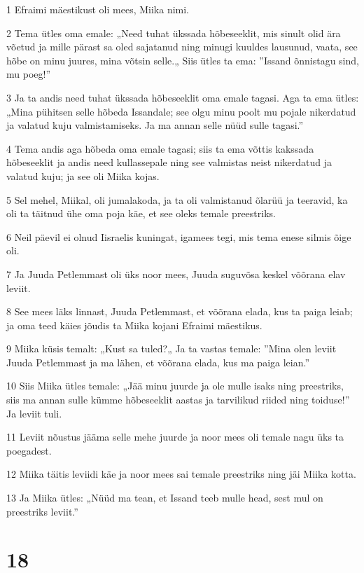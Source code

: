 \par 1 Efraimi mäestikust oli mees, Miika nimi.
\par 2 Tema ütles oma emale: „Need tuhat ükssada hõbeseeklit, mis sinult olid ära võetud ja mille pärast sa oled sajatanud ning minugi kuuldes lausunud, vaata, see hõbe on minu juures, mina võtsin selle.„ Siis ütles ta ema: ”Issand õnnistagu sind, mu poeg!”
\par 3 Ja ta andis need tuhat ükssada hõbeseeklit oma emale tagasi. Aga ta ema ütles: „Mina pühitsen selle hõbeda Issandale; see olgu minu poolt mu pojale nikerdatud ja valatud kuju valmistamiseks. Ja ma annan selle nüüd sulle tagasi.”
\par 4 Tema andis aga hõbeda oma emale tagasi; siis ta ema võttis kakssada hõbeseeklit ja andis need kullassepale ning see valmistas neist nikerdatud ja valatud kuju; ja see oli Miika kojas.
\par 5 Sel mehel, Miikal, oli jumalakoda, ja ta oli valmistanud õlarüü ja teeravid, ka oli ta täitnud ühe oma poja käe, et see oleks temale preestriks.
\par 6 Neil päevil ei olnud Iisraelis kuningat, igamees tegi, mis tema enese silmis õige oli.
\par 7 Ja Juuda Petlemmast oli üks noor mees, Juuda suguvõsa keskel võõrana elav leviit.
\par 8 See mees läks linnast, Juuda Petlemmast, et võõrana elada, kus ta paiga leiab; ja oma teed käies jõudis ta Miika kojani Efraimi mäestikus.
\par 9 Miika küsis temalt: „Kust sa tuled?„ Ja ta vastas temale: ”Mina olen leviit Juuda Petlemmast ja ma lähen, et võõrana elada, kus ma paiga leian.”
\par 10 Siis Miika ütles temale: „Jää minu juurde ja ole mulle isaks ning preestriks, siis ma annan sulle kümme hõbeseeklit aastas ja tarvilikud riided ning toiduse!” Ja leviit tuli.
\par 11 Leviit nõustus jääma selle mehe juurde ja noor mees oli temale nagu üks ta poegadest.
\par 12 Miika täitis leviidi käe ja noor mees sai temale preestriks ning jäi Miika kotta.
\par 13 Ja Miika ütles: „Nüüd ma tean, et Issand teeb mulle head, sest mul on preestriks leviit.”

\chapter{18}

